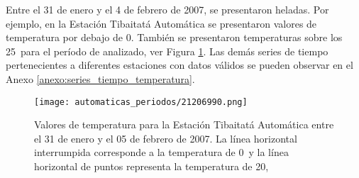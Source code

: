 Entre el 31 de enero y el 4 de febrero de 2007, se presentaron heladas. Por ejemplo, en la Estación Tibaitatá Automática se presentaron valores de temperatura por debajo de 0\celc. También se presentaron temperaturas sobre los 25\celc\ para el período de analizado, ver Figura \ref{graph:tiba}. Las demás series de tiempo pertenecientes a diferentes estaciones con datos válidos se pueden observar en el Anexo \ref{anexo:series_tiempo_temperatura}.

\begin{figure}[H]
\centering
\texttt{[image: automaticas\_periodos/21206990.png]}
\caption{Valores de temperatura para la Estación Tibaitatá Automática entre el 31 de enero y el 05 de febrero de 2007. La línea horizontal interrumpida corresponde a la temperatura de 0\celsius\ y la línea horizontal de puntos representa la temperatura de 20\celsius,}
\label{graph:tiba}
\end{figure}

